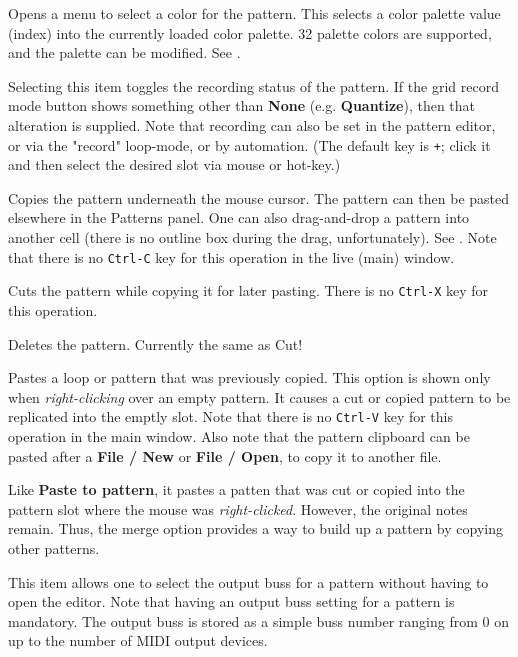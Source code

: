    Opens a menu to select a color for the pattern.  This selects a color
   palette value (index) into the currently loaded color palette.
   32 palette colors are supported, and the palette can be modified.
   See .

   Selecting this item toggles the recording status of the pattern.
   If the grid record mode button shows something other than
   \textbf{None} (e.g. \textbf{Quantize}), then that alteration is supplied.
   Note that recording can also be set in the pattern editor, or via
   the "record" loop-mode, or by automation.
   (The default key is \texttt{+}; click it and then select the
   desired slot via mouse or hot-key.)

   Copies the pattern underneath the mouse cursor.
   The pattern can then be pasted elsewhere in the Patterns panel.
   One can also drag-and-drop a pattern into another cell (there is no outline
   box during the drag, unfortunately).
   See .
   Note that there is no \texttt{Ctrl-C} key for this operation in the
   live (main) window.

   Cuts the pattern while copying it for later pasting.
   There is no \texttt{Ctrl-X} key for this operation.

   Deletes the pattern.  Currently the same as Cut!

   Pastes a loop or pattern that was previously copied.
   This option is shown only when
   \textsl{right-clicking} over an empty pattern.
   It causes a cut or copied pattern to be replicated into the emptly slot.
   Note that there is no \texttt{Ctrl-V} key for this operation in the
   main window.
   Also note that the pattern clipboard can be pasted after a
   \textbf{File / New} or \textbf{File / Open},
   to copy it to another file.

   Like \textbf{Paste to pattern}, it pastes a
   patten that was cut or copied into the pattern slot where the mouse was
   \textsl{right-clicked}.  However, the original notes remain.  Thus, the merge
   option provides a way to build up a pattern by copying other patterns.

   This item allows one to select the output buss for a pattern without having
   to open the editor.
   Note that having an output buss setting for a pattern is mandatory.
   The output buss is stored as a simple buss number ranging from 0 on up to
   the number of MIDI output devices.

